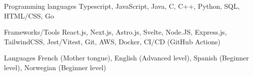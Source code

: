 
\begin{cvskills}
  \cvskill
    {Programming languages} %
    {Typescript, JavaScript, Java, C, C++, Python, SQL, HTML/CSS, Go} %

  \cvskill
    {Frameworks/Tools} %
    {React.js, Next.js, Astro.js, Svelte, Node.JS, Express.js, TailwindCSS, Jest/Vitest, Git, AWS, Docker, CI/CD (GitHub Actions)} %
    
  \cvskill
    {Languages} %
    {French (Mother tongue), English (Advanced level), Spanish (Beginner level), Norwegian (Beginner level)} %
    
\end{cvskills}
